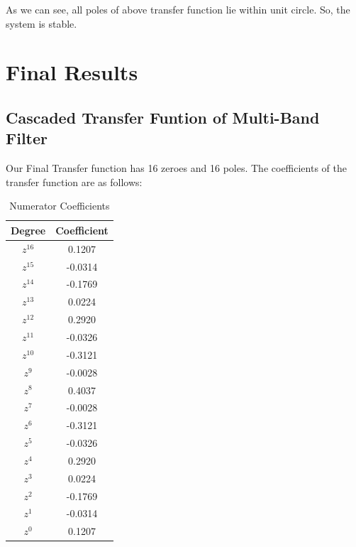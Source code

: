 \documentclass{article}
\begin{document}
As we can see, all poles of above transfer function lie within unit circle. So, the system is stable.
\newpage
\section{Final Results}
\subsection{Cascaded Transfer Funtion of Multi-Band Filter}
Our Final Transfer function has 16 zeroes and 16 poles. The coefficients of the transfer function are as follows:
\begin{table}[H]
    \centering
    \caption{Numerator Coefficients}
    \begin{tabular}{|c|c|}
        \hline
        Degree  & Coefficient \\
        \hline
        $z^{16}$ & 0.1207 \\ \hline
        $z^{15}$ & -0.0314 \\ \hline
        $z^{14}$ & -0.1769 \\ \hline
        $z^{13}$ & 0.0224 \\ \hline
        $z^{12}$ & 0.2920 \\ \hline
        $z^{11}$ & -0.0326 \\ \hline
        $z^{10}$ & -0.3121 \\ \hline
        $z^9$ & -0.0028 \\ \hline
        $z^8$ & 0.4037 \\ \hline
        $z^7$ & -0.0028 \\ \hline
        $z^6$ & -0.3121 \\ \hline
        $z^5$ & -0.0326 \\ \hline
        $z^4$ & 0.2920 \\ \hline
        $z^3$ & 0.0224 \\ \hline
        $z^2$ & -0.1769 \\ \hline
        $z^1$ & -0.0314 \\ \hline
        $z^0$ & 0.1207 \\ 
        \hline
    \end{tabular}
\end{table}
\end{document}
